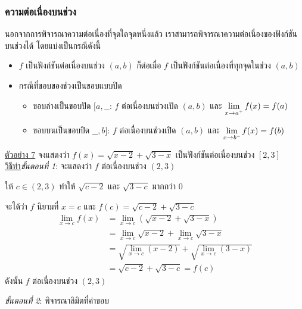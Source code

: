 \documentclass[hidelinks,12pt,a4paper]{article}
\newcommand{\s}{\space}
\begin{document}
\subsubsection{ความต่อเนื่องบนช่วง}
นอกจากการพิจารณาความต่อเนื่องที่จุดใดจุดหนึ่งแล้ว เราสามารถพิจารณาความต่อเนื่องของฟังก์ชันบนช่วงได้ โดยแบ่งเป็นกรณีดังนี้
\begin{itemize}
    \item $f$ เป็นฟังก์ชันต่อเนื่องบนช่วง $(a,b)$ ก็ต่อเมื่อ $f$ เป็นฟังก์ชันต่อเนื่องที่ทุกจุดในช่วง $(a,b)$
    \item กรณีที่ขอบของช่วงเป็นขอบแบบปิด
    \begin{itemize}
        \item ขอบล่างเป็นขอบปิด $[a,\_\_$:\hspace{2mm} $f$ ต่อเนื่องบนช่วงเปิด $(a,b)$ และ $\displaystyle\lim_{x\to a^{\scalebox{0.6}{$+$}}} f(x) = f(a)$
        \item ขอบบนเป็นขอบปิด $\_\_,b]$:\hspace{2mm} $f$ ต่อเนื่องบนช่วงเปิด $(a,b)$ และ $\displaystyle\lim_{x\to b^{\scalebox{0.6}{$-$}}} f(x) = f(b)$
    \end{itemize}
\end{itemize}
\newpage
\underline{ตัวอย่าง 7} จงแสดงว่า \s $f(x)=\sqrt{x-2}+\sqrt{3-x}$ \s เป็นฟังก์ชันต่อเนื่องบนช่วง $[2,3]$ \\[1ex]
\underline{\underline{วิธีทำ}}\hspace{8mm}\emph{ขั้นตอนที่ 1}: จะแสดงว่า $f$ ต่อเนื่องบนช่วง $(2,3)$

\hspace{15mm} ให้ $c\in(2,3)$ ทำให้ \s $\sqrt{c-2}$ และ $\sqrt{3-c}$ มากกว่า $0$ 

\hspace{15mm} จะได้ว่า $f$ นิยามที่ $x=c$ และ $f(c)=\sqrt{c-2}+\sqrt{3-c}$ 
\begin{align*}
    \lim_{x\to c} f(x) & = \lim_{x\to c} \left( \sqrt{x-2}+\sqrt{3-x} \right) \\ 
    & = \lim_{x\to c}\sqrt{x-2}+\lim_{x\to c}\sqrt{3-x} \\ 
    & = \sqrt{\lim_{x\to c}(x-2)}+\sqrt{\lim_{x\to c}(3-x)} \\ 
    & = \sqrt{c-2}+\sqrt{3-c} = f(c)
\end{align*}
\hspace{15mm} ดังนั้น \s $f$ ต่อเนื่องบนช่วง $(2,3)$

\vspace{1mm}
\hspace{15mm} \emph{ขั้นตอนที่ 2}: พิจารณาลิมิตที่ค่าขอบ
\end{document}
